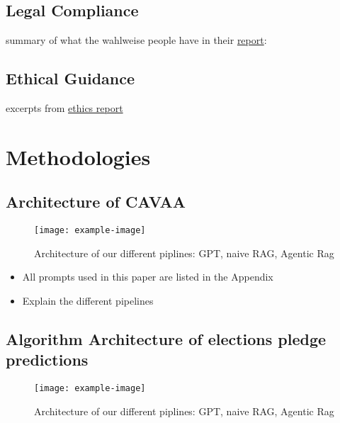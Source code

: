 \documentclass{article}
\begin{document}
\subsection{Legal Compliance}
summary of what the wahlweise people have in their \href{https://d197for5662m48.cloudfront.net/documents/publicationstatus/214219/preprint_pdf/e802706da7ff00ff8f40d50d9deb4e67.pdf}{report}: 


\subsection{Ethical Guidance}
excerpts from \href{https://docs.google.com/document/d/1Z1KqfAmVgEEz0tplmVgrmCt8g56RiUcq3_8HF6Js-2g/edit?tab=t.0}{ethics report}




\newpage
\section{Methodologies}



\subsection{Architecture of CAVAA}


\begin{figure}[H]
    \centering
    \texttt{[image: example-image]}
    \caption{Architecture of our different piplines: GPT, naive RAG, Agentic Rag}
    \label{fig:example2}
\end{figure}

\begin{itemize}
    \item All prompts used in this paper are listed in the Appendix
    \item Explain the different pipelines
\end{itemize}








\subsection{Algorithm Architecture of elections pledge predictions }
\begin{figure}[H]
    \centering
    \texttt{[image: example-image]}
    \caption{Architecture of our different piplines: GPT, naive RAG, Agentic Rag}
    \label{fig:example3}
\end{figure}
\end{document}
